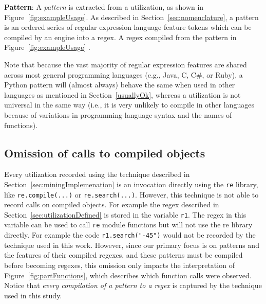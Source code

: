 \noindent \textbf{Pattern}: A \emph{pattern} is extracted from a utilization, as shown in Figure~\ref{fig:exampleUsage}. As described in Section~\ref{sec:nomenclature}, a pattern is an ordered series of regular expression language feature tokens which can be compiled by an engine into a regex.  A regex compiled from the pattern in Figure~\ref{fig:exampleUsage} .

Note that because the vast majority of regular expression features are shared across most general programming languages (e.g., Java, C, C\#, or Ruby), a Python pattern will (almost always) behave the same when used in other languages as mentioned in Section~\ref{usuallyOk}, whereas a utilization is not universal in the same way (i.e., it is very unlikely to compile in other languages because of variations in programming language syntax and the names of functions).

\subsection{Omission of calls to compiled objects}
Every utilization recorded using the technique described in Section~\ref{sec:miningImplemenation} is an invocation directly using the {\tt re} library, like {\tt re.compile(...)} or {\tt re.search(...)}.  However, this technique is not able to record calls on compiled objects.  For example the regex described in Section~\ref{sec:utilizationDefined} is stored in the variable {\tt r1}.  The regex in this variable can be used to call {\tt re} module functions but will not use the re library directly.  For example the code {\tt r1.search("-45")} would not be recorded by the technique used in this work.  However, since our primary focus is on patterns and the features of their compiled regexes, and these patterns must be compiled before becoming regexes, this omission only impacts the interpretation of Figure~\ref{fig:partFunctions}, which describes which function calls were observed.  Notice that \emph{every compilation of a pattern to a regex} is captured by the technique used in this study.
